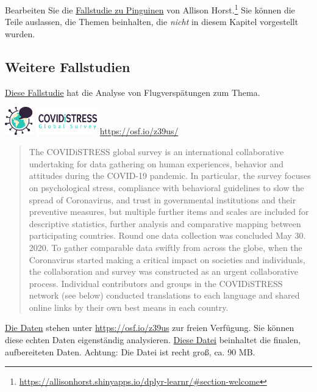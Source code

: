 \documentclass[
  a4paper,
  DIV=11]{scrreprt}
\theoremstyle{definition}
\theoremstyle{definition}
\theoremstyle{definition}
\theoremstyle{remark}
\begin{document}
Bearbeiten Sie die
\href{https://allisonhorst.shinyapps.io/dplyr-learnr/\#section-welcome}{Fallstudie
zu Pinguinen} von Allison Horst.\footnote{\url{https://allisonhorst.shinyapps.io/dplyr-learnr/\#section-welcome}}
Sie können die Teile auslassen, die Themen beinhalten, die \emph{nicht}
in diesem Kapitel vorgestellt wurden.

\subsection{Weitere Fallstudien}\label{weitere-fallstudien}

\href{https://sebastiansauer.github.io/Fallstudie_Flights/}{Diese
Fallstudie} hat die Analyse von Flugverspätungen zum Thema.

\includegraphics[width=0.3\textwidth,height=\textheight]{img/Covidistress1.jpg}
\url{https://osf.io/z39us/}

\begin{quote}
The COVIDiSTRESS global survey is an international collaborative
undertaking for data gathering on human experiences, behavior and
attitudes during the COVID-19 pandemic. In particular, the survey
focuses on psychological stress, compliance with behavioral guidelines
to slow the spread of Coronavirus, and trust in governmental
institutions and their preventive measures, but multiple further items
and scales are included for descriptive statistics, further analysis and
comparative mapping between participating countries. Round one data
collection was concluded May 30. 2020. To gather comparable data swiftly
from across the globe, when the Coronavirus started making a critical
impact on societies and individuals, the collaboration and survey was
constructed as an urgent collaborative process. Individual contributors
and groups in the COVIDiSTRESS network (see below) conducted
translations to each language and shared online links by their own best
means in each country.
\end{quote}

\href{https://osf.io/z39us/files/osfstorage}{Die Daten} stehen unter
\url{https://osf.io/z39us} zur freien Verfügung. Sie können diese echten
Daten eigenständig analysieren.
\href{https://osf.io/z39us/files/osfstorage/5f20b69732080501f5156b02}{Diese
Datei} beinhaltet die finalen, aufbereiteten Daten. Achtung: Die Datei
ist recht groß, ca. 90 MB.
\end{document}
